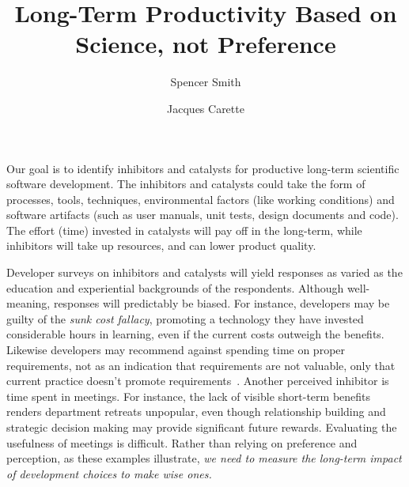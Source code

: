 \documentclass[sigconf, authorversion, nonacm]{acmart}
\begin{document}
\title{Long-Term Productivity Based on Science, not Preference}

\author{Spencer Smith}

\author{Jacques Carette}

\maketitle

Our goal is to identify inhibitors and catalysts for productive long-term
scientific software development.  The inhibitors and catalysts could take the
form of processes, tools, techniques, environmental factors (like working
conditions) and software artifacts (such as user manuals, unit tests, design
documents and code). The effort (time) invested in catalysts will pay off in
the long-term, while inhibitors will take up resources, and can lower product
quality.

Developer surveys on inhibitors and catalysts will yield responses as
varied as the education and experiential backgrounds of the respondents. 
Although well-meaning, responses will predictably be biased.
For instance, developers may be guilty of the \emph{sunk cost fallacy},
promoting a technology they have invested considerable hours in learning,
even if the current costs outweigh the benefits. Likewise developers
may recommend against spending time on proper requirements, not as an
indication that requirements are not valuable, only that current practice
doesn't promote requirements~\cite{HeatonAndCarver2015}. Another perceived
inhibitor is time spent in meetings. For instance, the lack of visible
short-term benefits renders department retreats unpopular, even though
relationship building and strategic decision making may provide significant
future rewards. Evaluating the usefulness of meetings is difficult.
Rather than relying on preference and perception,
as these examples illustrate, \emph{we need to measure the long-term impact
of development choices to make wise ones.}
\end{document}
